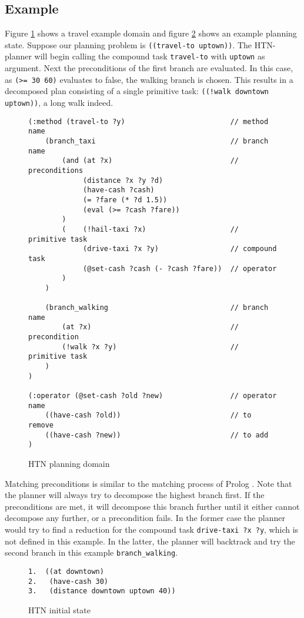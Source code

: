 \subsection{Example}
Figure \ref{fig:htnexample} shows a travel example domain and figure
\ref{fig:htnstate} shows an example planning state. Suppose our planning
problem is \verb|((travel-to uptown))|. The HTN-planner will begin calling the
compound task \verb|travel-to| with \verb|uptown| as argument. Next
the preconditions of the first branch are evaluated. In this case, as \verb|(>= 30 60)| 
evaluates to false, the walking branch is chosen. This results in a
decomposed plan consisting of a single primitive task: \verb|((!walk downtown uptown))|, a long walk indeed.
\begin{figure}[!ht]
\centering
\begin{verbatim}
(:method (travel-to ?y)                         // method name
    (branch_taxi                                // branch name
        (and (at ?x)                            // preconditions
             (distance ?x ?y ?d)
             (have-cash ?cash)
             (= ?fare (* ?d 1.5))
             (eval (>= ?cash ?fare))
        )
        (    (!hail-taxi ?x)                    // primitive task
             (drive-taxi ?x ?y)                 // compound task
             (@set-cash ?cash (- ?cash ?fare))  // operator
        )
    )

    (branch_walking                             // branch name
        (at ?x)                                 // precondition
        (!walk ?x ?y)                           // primitive task
    )
)

(:operator (@set-cash ?old ?new)                // operator name
    ((have-cash ?old))                          // to remove
    ((have-cash ?new))                          // to add
)
\end{verbatim}
\caption{HTN planning domain}
\label{fig:htnexample}
\end{figure}

Matching preconditions is similar to the matching process of Prolog
\cite{bratko}. Note that the planner will always try to decompose the highest
branch first.  If the preconditions are met, it will decompose this branch
further until it either cannot decompose any further, or a precondition fails.
In the former case the planner would try to find a reduction for the compound
task \verb|drive-taxi ?x ?y|, which is not defined in this example. In the
latter, the planner will backtrack and try the second branch in this example
\verb|branch_walking|.
\begin{figure}[!ht]
\centering
\begin{verbatim}
1.  ((at downtown)
2.   (have-cash 30)
3.   (distance downtown uptown 40))
\end{verbatim}
\caption{HTN initial state}
\label{fig:htnstate}
\end{figure}

